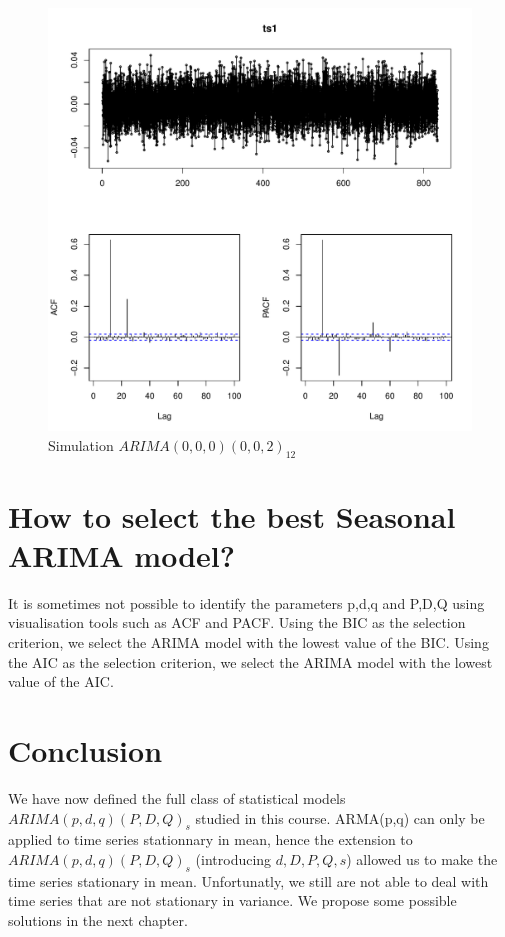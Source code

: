 \documentclass[a4paper,11pt,oneside,onecolumn]{book}
\begin{document}
\begin{figure}[!h]
\begin{center}
\includegraphics[width=.7\linewidth]{ SMAQ2.pdf}
\caption{Simulation $ARIMA(0,0,0)(0,0,2)_{12}$}\label{fig:sarima:Q2}
\end{center}
\end{figure}

\section{How to select the best Seasonal ARIMA model?}

It is sometimes not possible to identify the parameters p,d,q and P,D,Q using visualisation tools such as ACF and PACF.
Using the BIC as the selection criterion,  we select the ARIMA model with the lowest value of the  BIC.
Using the AIC as the selection criterion, we select the ARIMA model with the lowest value of the  AIC.
 





\section{Conclusion}

We have now defined the full class of statistical models $ARIMA(p,d,q)(P,D,Q)_s$ 
studied in this course. ARMA(p,q) can only be applied to time series stationnary in mean, hence 
the extension to $ARIMA(p,d,q)(P,D,Q)_s$  (introducing $d,D,P,Q,s$) allowed us to make the time series stationary in mean.
Unfortunatly, we still are not able to deal with time series that are not stationary in variance. 
We propose some possible solutions in the next chapter. 
  
\end{document}
